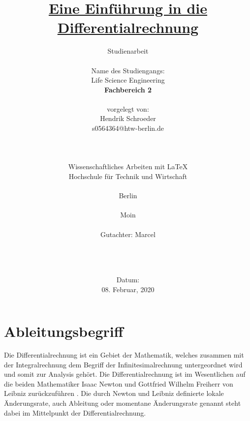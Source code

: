 \documentclass[11pt, a4paper]{report}
\begin{document}
\title{ \underline{Eine Einführung in die Differentialrechnung}}
\author{Studienarbeit\\
  \\
  Name des Studiengangs:\\
  \Large Life Science Engineering\\  
  \Large \textbf{Fachbereich 2}  
  \\
  \\  
  vorgelegt von:\\
  \Large Hendrik Schroeder\\
  s0564364@htw-berlin.de\\
  \\ 
  \\
  \\
  \Large Wissenschaftliches Arbeiten mit \LaTeX{}\\
  Hochschule für Technik und Wirtschaft\\
  \\
  Berlin
  \\
  \\
  Moin\\
  \\
  Gutachter: Marcel 
  \\
  \\
  \\
  \\}
  \date{Datum:\\
  08. Februar, 2020}
\maketitle

\setcounter{tocdepth}{2}
\tableofcontents
\clearpage

\listoffigures
{}
\clearpage

\listoftables
{}
\clearpage

\chapter{Ableitungsbegriff}
Die Differentialrechnung ist ein Gebiet der Mathematik, welches zusammen mit der Integralrechnung dem Begriff der Infinitesimalrechnung untergeordnet wird und somit zur Analysis gehört. Die Differentialrechnung ist im Wesentlichen auf die beiden Mathematiker Isaac Newton und Gottfried Wilhelm Freiherr von Leibniz zurückzuführen \cite[Seite 188]{Wendland.2005}. Die durch Newton und Leibniz definierte lokale Änderungsrate, auch Ableitung oder momentane Änderungsrate genannt steht dabei im Mittelpunkt der Differentialrechnung.
\end{document}
